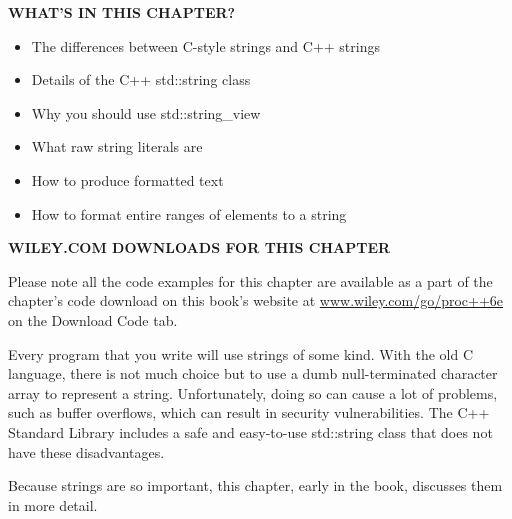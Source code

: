\noindent
\textbf{WHAT’S IN THIS CHAPTER?}

\begin{itemize}
\item
The differences between C-style strings and C++ strings

\item
Details of the C++ std::string class

\item
Why you should use std::string\_view

\item
What raw string literals are

\item
How to produce formatted text

\item
How to format entire ranges of elements to a string
\end{itemize}

\noindent
\textbf{WILEY.COM DOWNLOADS FOR THIS CHAPTER}

Please note all the code examples for this chapter are available as a part of the chapter’s code download on this book’s website at \url{www.wiley.com/go/proc++6e} on the Download Code tab.

Every program that you write will use strings of some kind. With the old C language, there is not much choice but to use a dumb null-terminated character array to represent a string. Unfortunately, doing so can cause a lot of problems, such as buffer overflows, which can result in security vulnerabilities. The C++ Standard Library includes a safe and easy-to-use std::string class that does not have these disadvantages.

Because strings are so important, this chapter, early in the book, discusses them in more detail.














